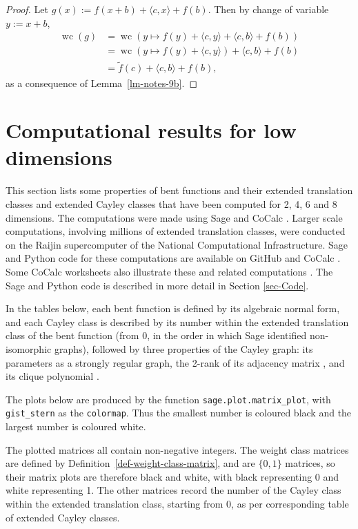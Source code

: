 \documentclass[12pt,a4paper]{article}
\newcommand{\dual}[1]{\widetilde{#1}}
\newcommand{\weightclass}[1]{\operatorname{wc}\left(#1\right)}
\begin{document}
\begin{proof}
Let $g(x) := f(x+b) + \langle c, x \rangle + f(b)$.
Then by change of variable $y:=x+b$,
\begin{align*}
\weightclass{g}
&=
\weightclass{y \mapsto f(y) + \langle c, y \rangle + \langle c, b \rangle + f(b)}
\\
&=
\weightclass{y \mapsto f(y) + \langle c, y \rangle} + \langle c, b \rangle + f(b)
\\
&=
\dual{f}(c) + \langle c, b \rangle + f(b),
\end{align*}
as a consequence of Lemma~\ref{lm-notes-9b}.
\end{proof}


\section{Computational results for low dimensions}
\label{sec-Empirical}
This section lists some properties of bent functions and their extended translation classes and extended Cayley classes
that have been computed for 2, 4, 6 and 8 dimensions.
The computations were made using Sage \cite{SageMath7517} and CoCalc \cite{CoCalc}.
Larger scale computations, involving millions of extended translation classes,
were conducted on the Raijin supercomputer of the National Computational Infrastructure.
Sage and Python code for these computations are available on GitHub \cite{Leo16GitHub} and CoCalc \cite{Leo17CoCalc}.
Some CoCalc worksheets also illustrate these and related computations \cite{Leo17CoCalc}.
The Sage and Python code is described in more detail in Section \ref{sec-Code}.

In the tables below, each bent function is defined by its algebraic normal form, and each Cayley class is described by
its number within the extended translation class of the bent function (from 0, in the order in which Sage identified non-isomorphic graphs),
followed by three properties of the Cayley graph: its parameters as a strongly regular graph,
the 2-rank of its adjacency matrix \cite{Brov92}, and its clique polynomial \cite{HoeL94}.

The plots below are produced by the function \texttt{sage.}\texttt{plot.}\texttt{matrix\_plot},
with \texttt{gist\_stern} as the \texttt{colormap}.
Thus the smallest number is coloured black and the largest number is coloured white.

The plotted matrices all contain non-negative integers.
The weight class matrices are defined by Definition~\ref{def-weight-class-matrix}, and are $\{0,1\}$ matrices,
so their matrix plots are therefore black and white, with black representing 0 and white representing 1.
The other matrices record the number of the Cayley class within the
extended translation class, starting from 0, as per corresponding table of extended Cayley classes.
\end{document}
